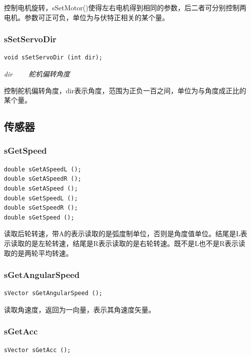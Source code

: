 \documentclass[titlepage,a4paper]{ctexart}
\begin{document}
控制电机旋转，sSetMotor()使得左右电机得到相同的参数，后二者可分别控制两电机。参数可正可负，单位为与伏特正相关的某个量。 \\

\subsubsection{sSetServoDir}
\begin{lstlisting}[numbers=none]
void sSetServoDir (int dir);
\end{lstlisting}
\par \emph{dir 　　舵机偏转角度}

控制舵机偏转角度，dir表示角度，范围为正负一百之间，单位为与角度成正比的某个量。 \\

\subsection{传感器}
\subsubsection{sGetSpeed}
\begin{lstlisting}[numbers=none]
double sGetASpeedL ();
double sGetASpeedR ();
double sGetASpeed ();
double sGetSpeedL ();
double sGetSpeedR ();
double sGetSpeed ();
\end{lstlisting}

读取后轮转速，带A的表示读取的是弧度制单位，否则是角度值单位。结尾是L表示读取的是左轮转速，结尾是R表示读取的是右轮转速。既不是L也不是R表示读取的是两轮平均转速。 \\

\subsubsection{sGetAngularSpeed}
\begin{lstlisting}[numbers=none]
sVector sGetAngularSpeed ();
\end{lstlisting}

读取角速度，返回为一向量，表示其角速度矢量。 \\

\subsubsection{sGetAcc}
\begin{lstlisting}[numbers=none]
sVector sGetAcc ();
\end{lstlisting}
\end{document}
